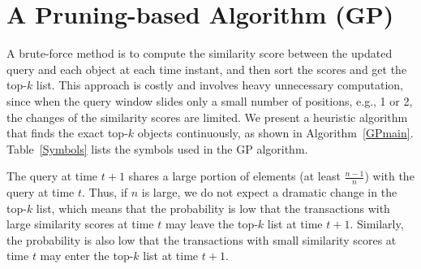
\section{A Pruning-based Algorithm (GP)}
\label{sec:pruning-method}
A brute-force method is to compute the similarity score between the updated query and each object at each time instant, and then sort the scores and get the top-$k$ list. This approach is costly and involves heavy unnecessary computation, since when the query window slides only a small number of positions, e.g., 1 or 2, the changes of the similarity scores are limited. We present a heuristic algorithm that finds the exact top-$k$ objects continuously, as shown in Algorithm~\ref{GPmain}. Table~\ref{Symbols} lists the symbols used in the GP algorithm.

The query at time $t+1$ shares a large portion of elements (at least $\frac{n-1}{n}$) with the query at time $t$. Thus, if $n$ is large, we do not expect a dramatic change in the top-$k$ list, which means that the probability is low that the transactions with large similarity scores at time $t$ may leave the top-$k$ list at time $t+1$.  Similarly, the probability is also low that the transactions with small similarity scores at time $t$ may enter the top-$k$ list at time $t+1$. 


